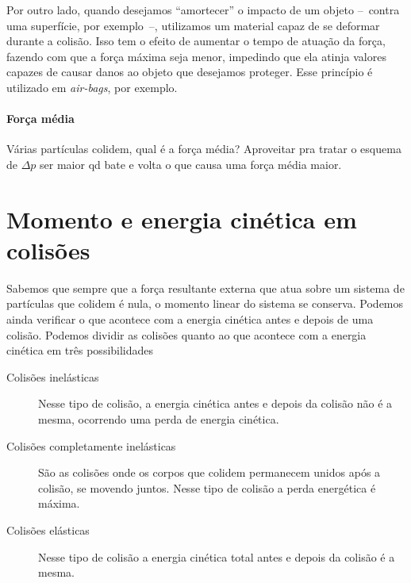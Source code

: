 Por outro lado, quando desejamos ``amortecer'' o impacto de um objeto --~contra uma superfície, por exemplo~--, utilizamos um material capaz de se deformar durante a colisão. Isso tem o efeito de aumentar o tempo de atuação da força, fazendo com que a força máxima seja menor, impedindo que ela atinja valores capazes de causar danos ao objeto que desejamos proteger. Esse princípio é utilizado em \emph{air-bags}, por exemplo.

\paragraph{Força média}

Várias partículas colidem, qual é a força média? Aproveitar pra tratar o esquema de $\Delta p$ ser maior qd bate e volta o que causa uma força média maior.

\section{Momento e energia cinética em colisões}

Sabemos que sempre que a força resultante externa que atua sobre um sistema de partículas que colidem é nula, o momento linear do sistema se conserva. Podemos ainda verificar o que acontece com a energia cinética antes e depois de uma colisão. Podemos dividir as colisões quanto ao que acontece com a energia cinética em três possibilidades
\begin{description}
  \item[Colisões inelásticas] Nesse tipo de colisão, a energia cinética antes e depois da colisão não é a mesma, ocorrendo uma perda de energia cinética.
  \item[Colisões completamente inelásticas] São as colisões onde os corpos que colidem permanecem unidos após a colisão, se movendo juntos. Nesse tipo de colisão a perda energética é máxima. 
  \item[Colisões elásticas] Nesse tipo de colisão a energia cinética total antes e depois da colisão é a mesma.
\end{description}

